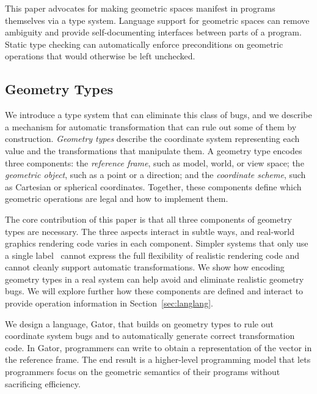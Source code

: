 This paper advocates for making geometric spaces manifest in programs themselves via a type system.
Language support for geometric spaces can remove ambiguity and provide self-documenting interfaces between parts of a program.
Static type checking can automatically enforce preconditions on geometric operations that would otherwise be left unchecked.


\subsection{Geometry Types}

We introduce a type system that can eliminate this class of bugs, and we describe a mechanism for automatic transformation that can rule out some of them by construction.
\emph{Geometry types} describe the coordinate system representing each value and the transformations that manipulate them.
A geometry type encodes three components:
the \emph{reference frame}, such as model, world, or view space;
the \emph{geometric object}, such as a point or a direction;
and the \emph{coordinate scheme}, such as Cartesian or spherical coordinates.
Together, these components define which geometric operations are legal and how to implement them.

The core contribution of this paper is that all three components of geometry types are necessary.  
The three aspects interact in subtle ways, and real-world graphics rendering code varies in each component.
Simpler systems that only use a single label~\cite{safegi} cannot express the full flexibility of realistic rendering code and cannot cleanly support automatic transformations.
We show how encoding geometry types in a real system can help avoid and eliminate realistic geometry bugs.
We will explore further how these components are defined and interact to provide operation information in Section~\ref{sec:langlang}.

We design a language, Gator, that builds on geometry types to rule out coordinate system bugs and to automatically generate correct transformation code.
In Gator, programmers can write  to obtain a representation of the  vector in the  reference frame.
The end result is a higher-level programming model that lets programmers focus on the geometric semantics of their programs without sacrificing efficiency.

